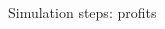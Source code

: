 \documentclass[9pt]{beamer}
\begin{document}
\begin{frame}[fragile]{Simulation steps: profits}
\begin{columns}[T]
 \begin{column}{.3\textwidth}
 \vspace{-3.25\baselineskip}
 \begin{block}{}
  \end{block}
  \end{column}
    
\end{columns}

\end{frame}
\end{document}
